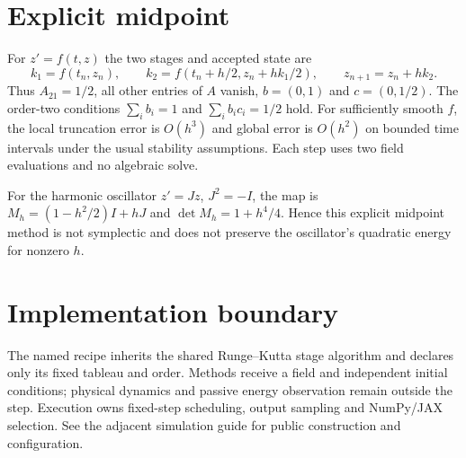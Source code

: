\documentclass[11pt,a4paper]{article}
\begin{document}
\section*{Explicit midpoint}
For $z'=f(t,z)$ the two stages and accepted state are
\[
k_1=f(t_n,z_n),\qquad k_2=f(t_n+h/2,z_n+hk_1/2),\qquad z_{n+1}=z_n+hk_2.
\]
Thus $A_{21}=1/2$, all other entries of $A$ vanish, $b=(0,1)$ and $c=(0,1/2)$.
The order-two conditions $\sum_i b_i=1$ and $\sum_i b_ic_i=1/2$ hold.
For sufficiently smooth $f$, the local truncation error is $O(h^3)$ and global error is $O(h^2)$ on bounded time intervals under the usual stability assumptions.
Each step uses two field evaluations and no algebraic solve.

For the harmonic oscillator $z'=Jz$, $J^2=-I$, the map is
$M_h=(1-h^2/2)I+hJ$ and $\det M_h=1+h^4/4$.
Hence this explicit midpoint method is not symplectic and does not preserve the oscillator's quadratic energy for nonzero $h$.

\section*{Implementation boundary}
The named recipe inherits the shared Runge--Kutta stage algorithm and declares only its fixed tableau and order.
Methods receive a field and independent initial conditions; physical dynamics and passive energy observation remain outside the step.
Execution owns fixed-step scheduling, output sampling and NumPy/JAX selection.
See the adjacent simulation guide for public construction and configuration.
\end{document}
